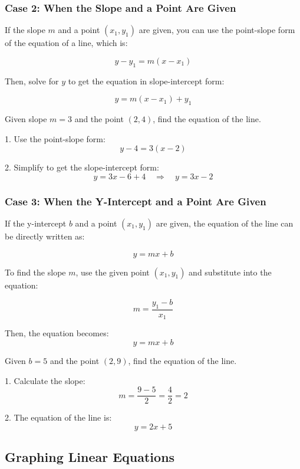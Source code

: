 \subsubsection{Case 2: When the Slope and a Point Are Given}
If the slope \( m \) and a point \((x_1, y_1)\) are given, you can use the point-slope form of the equation of a line, which is:

\[
y - y_1 = m(x - x_1)
\]

Then, solve for \( y \) to get the equation in slope-intercept form:

\[
y = m(x - x_1) + y_1
\]

\begin{example}

 Given slope \( m = 3 \) and the point \((2, 4)\), find the equation of the line.

1. Use the point-slope form:
   \[
   y - 4 = 3(x - 2)
   \]

2. Simplify to get the slope-intercept form:
   \[
   y = 3x - 6 + 4 \quad \Rightarrow \quad y = 3x - 2
   \]

\end{example}

\subsubsection{Case 3: When the Y-Intercept and a Point Are Given}
If the y-intercept \( b \) and a point \((x_1, y_1)\) are given, the equation of the line can be directly written as:

\[
y = mx + b
\]

To find the slope \( m \), use the given point \((x_1, y_1)\) and substitute into the equation:

\[
m = \frac{y_1 - b}{x_1}
\]

Then, the equation becomes:
\[
y = mx + b
\]

\begin{example}

 Given \( b = 5 \) and the point \((2, 9)\), find the equation of the line.

1. Calculate the slope:
   \[
   m = \frac{9 - 5}{2} = \frac{4}{2} = 2
   \]

2. The equation of the line is:
   \[
   y = 2x + 5
   \]

\end{example}



\subsection{Graphing Linear Equations}

